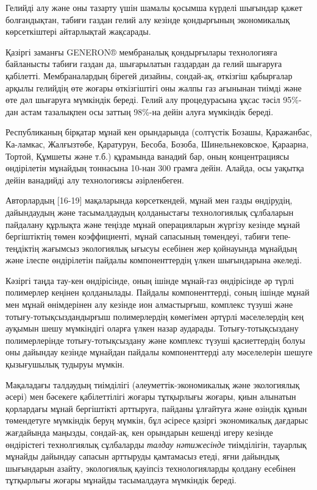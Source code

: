 \begin{multicols}{2}
Гелийді алу және оны тазарту үшін шамалы қосымша күрделі шығындар қажет
болғандықтан, табиғи газдан гелий алу кезінде қондырғының экономикалық
көрсеткіштері айтарлықтай жақсарады.

Қазіргі заманғы GENERON® мембраналық қондырғылары технологияға
байланысты табиғи газдан да, шығарылатын газдардан да гелий шығаруға
қабілетті. Мембраналардың бірегей дизайны, сондай-ақ, өткізгіш
қабырғалар арқылы гелийдің өте жоғары өткізгіштігі оны жалпы газ
ағынынан тиімді және өте дәл шығаруға мүмкіндік береді. Гелий алу
процедурасына ұқсас тәсіл 95\%-дан астам тазалықпен осы заттың 98\%-на
дейін алуға мүмкіндік береді.

Республиканың бірқатар мұнай кен орындарында (солтүстік Бозашы,
Қаражанбас, Ка-ламкас, Жалғызтөбе, Қаратурун, Бесоба, Бозоба,
Шинельнековское, Қараарна, Тортой, Құмшеты және т.б.) құрамында ванадий
бар, оның концентрациясы өндірілетін мұнайдың тоннасына 10-нан 300
грамға дейін. Алайда, осы уақытқа дейін ванадийді алу технологиясы
әзірленбеген.

Авторлардың {[}16-19{]} мақаларында көрсеткендей, мұнай мен газды
өндірудің, дайындаудың және тасымалдаудың қолданыстағы технологиялық
сұлбаларын пайдалану құрлықта және теңізде мұнай операцияларын жүргізу
кезінде мұнай бергіштіктің төмен коэффициенті, мұнай сапасының
төмендеуі, табиғи тепе-теңдіктің жағымсыз экологиялық ығысуы есебінен
жер қойнауында мұнайдың және ілеспе өндірілетін пайдалы компоненттердің
үлкен шығындарына әкеледі.

Кәзіргі таңда тау-кен өндірісінде, оның ішінде мұнай-газ өндірісінде әр
түрлі полимерлер кеңінен қолданылады. Пайдалы компоненттерді, соның
ішінде мұнай мен мұнай өнімдерінен алу кезінде ион алмастырғыш, комплекс
түзуші және тотығу-тотықсыздандырғыш полимерлердің көмегімен әртүрлі
мәселелердің кең ауқымын шешу мүмкіндігі оларға үлкен назар аударады.
Тотығу-тотықсыздану полимерлерінде тотығу-тотықсыздану және комплекс
түзуші қасиеттердің болуы оны дайындау кезінде мұнайдан пайдалы
компоненттерді алу мәселелерін шешуге қызығушылық тудыруы мүмкін.

Мақаладағы талдаудың тиімділігі (әлеуметтік-экономикалық және
экологиялық әсері) мен бәсекеге қабілеттілігі жоғары тұтқырлығы жоғары,
қиын алынатын қорлардағы мұнай бергіштікті арттыруға, пайданы ұлғайтуға
және өзіндік құнын төмендетуге мүмкіндік беруң мүмкін, бұл әсіресе
қазіргі экономикалық дағдарыс жағдайында маңызды, сондай-ақ, кен
орындарын кешенді игеру кезінде өндірістегі технолгиялық сұлбаларды
\emph{талдау нәтижесінде} тиімділігін, тауарлық мұнайды дайындау сапасын
арттыруды қамтамасыз етеді, яғни дайындық шығындарын азайту, экологиялық
қауіпсіз технологияларды қолдану есебінен тұтқырлығы жоғары мұнайды
тасымалдауға мүмкіндік береді.


\end{multicols}
